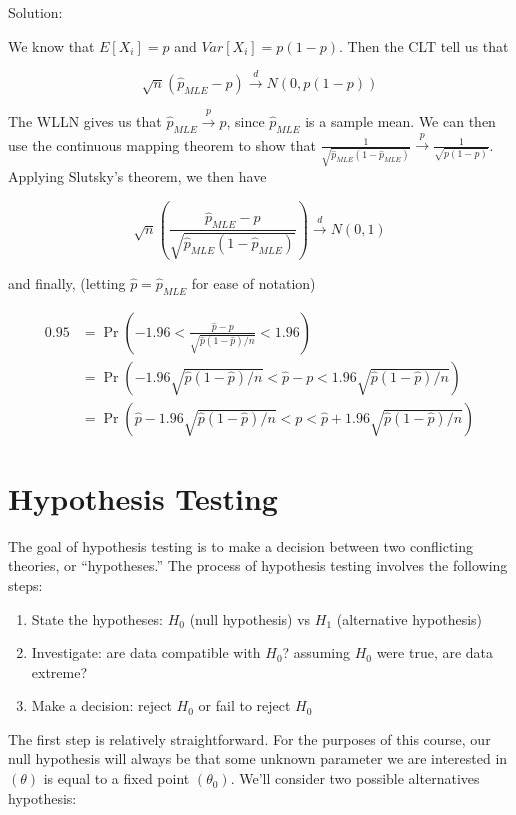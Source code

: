 \documentclass[
  letterpaper,
  DIV=11,
  numbers=noendperiod]{scrreprt}
\begin{document}
Solution:

We know that \(E[X_i] = p\) and \(Var[X_i] = p(1-p)\). Then the CLT tell
us that

\[
\sqrt{n}(\hat{p}_{MLE} - p) \overset{d}{\to} N(0, p(1-p))
\]

The WLLN gives us that \(\hat{p}_{MLE} \overset{p}{\to} p\), since
\(\hat{p}_{MLE}\) is a sample mean. We can then use the continuous
mapping theorem to show that
\(\frac{1}{\sqrt{\hat{p}_{MLE}(1-\hat{p}_{MLE})}} \overset{p}{\to} \frac{1}{\sqrt{p(1 - p)}}\).
Applying Slutsky's theorem, we then have

\[
\sqrt{n}\left(\frac{\hat{p}_{MLE} - p}{\sqrt{\hat{p}_{MLE}(1-\hat{p}_{MLE})}}\right) \overset{d}{\to} N(0, 1)
\]

and finally, (letting \(\hat{p} = \hat{p}_{MLE}\) for ease of notation)

\begin{align*}
    0.95 & = \Pr\left(-1.96 < \frac{\hat{p} - p}{\sqrt{\hat{p}(1-\hat{p})/n}}  < 1.96\right)  \\
    & = \Pr\left(-1.96\sqrt{\hat{p}(1-\hat{p})/n} < \hat{p} - p  < 1.96\sqrt{\hat{p}(1-\hat{p})/n}\right) \\
    & = \Pr\left(\hat{p} -1.96\sqrt{\hat{p}(1-\hat{p})/n} <  p  < \hat{p} + 1.96\sqrt{\hat{p}(1-\hat{p})/n}\right)
\end{align*}


\chapter{Hypothesis Testing}\label{hypothesis-testing}

The goal of hypothesis testing is to make a decision between two
conflicting theories, or ``hypotheses.'' The process of hypothesis
testing involves the following steps:

\begin{enumerate}
\def\labelenumi{\arabic{enumi}.}
\item
  State the hypotheses: \(H_0\) (null hypothesis) vs \(H_1\)
  (alternative hypothesis)
\item
  Investigate: are data compatible with \(H_0\)? assuming \(H_0\) were
  true, are data extreme?
\item
  Make a decision: reject \(H_0\) or fail to reject \(H_0\)
\end{enumerate}

The first step is relatively straightforward. For the purposes of this
course, our null hypothesis will always be that some unknown parameter
we are interested in \((\theta)\) is equal to a fixed point
\((\theta_0)\). We'll consider two possible alternatives hypothesis:
\end{document}

